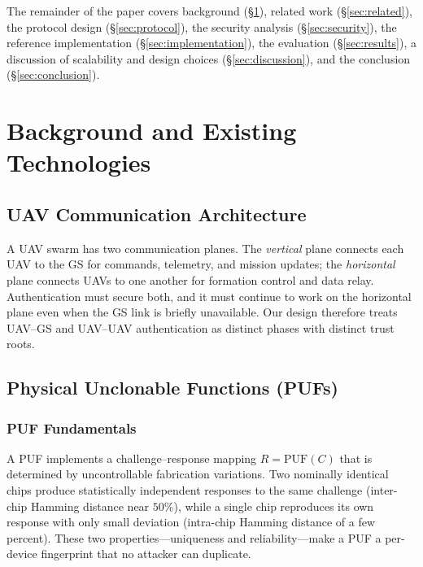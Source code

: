 \documentclass[11pt,a4paper]{article}
\begin{document}
The remainder of the paper covers background (\S\ref{sec:background}), related
work (\S\ref{sec:related}), the protocol design (\S\ref{sec:protocol}), the
security analysis (\S\ref{sec:security}), the reference implementation
(\S\ref{sec:implementation}), the evaluation (\S\ref{sec:results}), a discussion
of scalability and design choices (\S\ref{sec:discussion}), and the conclusion
(\S\ref{sec:conclusion}).

\section{Background and Existing Technologies}
\label{sec:background}

\subsection{UAV Communication Architecture}

A UAV swarm has two communication planes. The \emph{vertical} plane connects
each UAV to the GS for commands, telemetry, and mission updates; the
\emph{horizontal} plane connects UAVs to one another for formation control and
data relay. Authentication must secure both, and it must continue to work on
the horizontal plane even when the GS link is briefly unavailable. Our design
therefore treats UAV--GS and UAV--UAV authentication as distinct phases with
distinct trust roots.

\subsection{Physical Unclonable Functions (PUFs)}

\subsubsection{PUF Fundamentals}

A PUF implements a challenge--response mapping $R = \mathrm{PUF}(C)$ that is
determined by uncontrollable fabrication variations. Two nominally identical
chips produce statistically independent responses to the same challenge
(inter-chip Hamming distance near $50\%$), while a single chip reproduces its
own response with only small deviation (intra-chip Hamming distance of a few
percent). These two properties---uniqueness and reliability---make a PUF a
per-device fingerprint that no attacker can duplicate.
\end{document}

